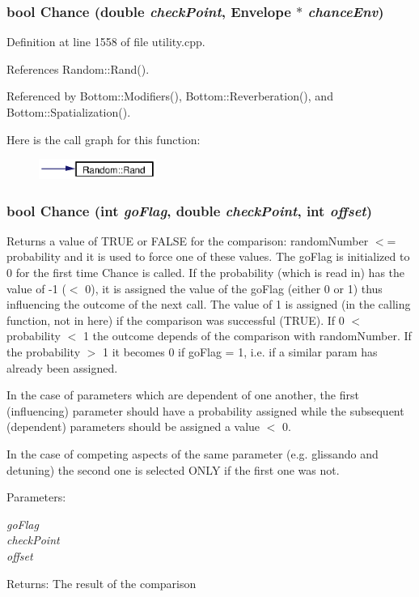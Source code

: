 \subsubsection{\setlength{\rightskip}{0pt plus 5cm}bool Chance (double {\em check\-Point}, Envelope $\ast$ {\em chance\-Env})}\label{utility_8cpp_a26}




Definition at line 1558 of file utility.cpp.

References Random::Rand().

Referenced by Bottom::Modifiers(), Bottom::Reverberation(), and Bottom::Spatialization().

Here is the call graph for this function:\begin{figure}[H]
\begin{center}
\leavevmode
\includegraphics[width=109pt]{utility_8cpp_a26_cgraph}
\end{center}
\end{figure}
\subsubsection{\setlength{\rightskip}{0pt plus 5cm}bool Chance (int {\em go\-Flag}, double {\em check\-Point}, int {\em offset})}\label{utility_8cpp_a25}


Returns a value of TRUE or FALSE for the comparison: random\-Number $<$= probability and it is used to force one of these values. The go\-Flag is initialized to 0 for the first time Chance is called. If the probability (which is read in) has the value of -1 ($<$ 0), it is assigned the value of the go\-Flag (either 0 or 1) thus influencing the outcome of the next call. The value of 1 is assigned (in the calling function, not in here) if the comparison was successful (TRUE). If 0 $<$ probability $<$ 1 the outcome depends of the comparison with random\-Number. If the probability $>$ 1 it becomes 0 if go\-Flag = 1, i.e. if a similar param has already been assigned.

In the case of parameters which are dependent of one another, the first (influencing) parameter should have a probability assigned while the subsequent (dependent) parameters should be assigned a value $<$ 0.

In the case of competing aspects of the same parameter (e.g. glissando and detuning) the second one is selected ONLY if the first one was not. \begin{Desc}
\item[Parameters:]
\begin{description}
\item[{\em go\-Flag}]\item[{\em check\-Point}]\item[{\em offset}]\end{description}
\end{Desc}
\begin{Desc}
\item[Returns:]The result of the comparison \end{Desc}


